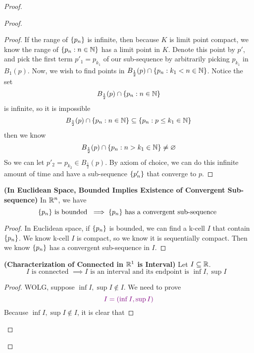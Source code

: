\documentclass{report}
\begin{document}
\begin{proof}
\begin{proof}
\begin{proof}
If the range of $\{ p_n \}$ is infinite, then because $K$ is limit point compact, we know  the range of  $\{ p_n:n\in\mathbb{N} \}$ has a limit point in $K$. Denote this point  by $p'$, and pick the first term $p'_1=p_{k_1}$ of our sub-sequence by arbitrarily picking  $p_{k_1}$ in  $B_1(p)$. Now, we wish to find points in $B_{\frac{1}{2}}(p)\cap \{ p_n:k_1<n\in\mathbb{N} \}$. Notice the set
\begin{equation}
B_{\frac{1}{2}}(p)\cap \{ p_n:n\in\mathbb{N} \}
\end{equation}
is infinite, so  it is impossible
\begin{equation}
B_{\frac{1}{2}}(p)\cap \{ p_n:n\in\mathbb{N} \}\subseteq \{ p_n:p\leq k_1\in\mathbb{N} \}
\end{equation}
then we know 
\begin{equation}
\text{ $B_{\frac{1}{2}}(p)\cap \{ p_n:n>k_1\in\mathbb{N} \}\neq \varnothing$  }
\end{equation}
So we can let $p'_2=p_{k_2}\in B_{\frac{1}{2}}(p)$. By axiom of choice, we can do this infinite amount of time and have a sub-sequence $\{ p'_n \}$ that converge to $p$.
\end{proof}
\begin{theorem}
\label{3.9.8}
\textbf{(In Euclidean Space, Bounded Implies Existence of Convergent Sub-sequence)} In $\mathbb{R}^n$, we have
 \begin{equation}
\{ p_n \}\text{ is bounded }\implies \{ p_n \}\text{ has a convergent sub-sequence }
\end{equation}
\end{theorem}
\begin{proof}
In Euclidean space, if $\{ p_n \}$ is bounded, we can find a k-cell $I$ that contain  $\{ p_n \}$. We know k-cell $I$ is compact, so we know it is sequentially compact. Then we know  $\{ p_n \}$ has a convergent sub-sequence in $I$. 
\end{proof}
\begin{theorem}
\label{3.9.9}
\textbf{(Characterization of Connected in $\mathbb{R}^1$ is Interval)} Let $I\subseteq \mathbb{R}$. 
\begin{equation*}
I\text{ is connected }\implies I\text{ is an interval and its endpoint is  $\inf I,\sup I$ }
\end{equation*}
\end{theorem}
\begin{proof}
WOLG, suppose $\inf I,\sup I \not\in I$. We need to prove
\begin{equation*}
  \textcolor{violet}{I=(\inf I,\sup  I)}
\end{equation*}
Because $\inf I,\sup I\not \in I$, it is clear that 

\end{proof}
\end{proof}
\end{proof}
\end{document}
